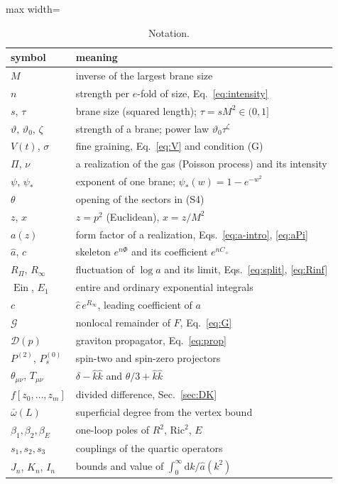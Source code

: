 \documentclass[a4paper,11pt]{article}
\newcommand{\dd}{\mathrm{d}}
\newcommand{\Ein}{\operatorname{Ein}}
\newcommand{\Pt}{P^{(2)}}
\newcommand{\Ps}{P^{(0)}_{s}}
\newcommand{\Ric}{\mathrm{Ric}}
\begin{document}
\begin{table}[tb]
\centering
\small\begin{adjustbox}{max width=\linewidth}\begin{tabular}{lp{5.6cm}}
symbol & meaning\\
\hline
$M$ & inverse of the largest brane size\\
$n$ & strength per $e$-fold of size, Eq.~\eqref{eq:intensity}\\
$s$, $\tau$ & brane size (squared length); $\tau=sM^2\in(0,1]$\\
$\vartheta$, $\vartheta_0$, $\zeta$ & strength of a brane; power law $\vartheta_0\tau^\zeta$\\
$V(t)$, $\sigma$ & fine graining, Eq.~\eqref{eq:V} and condition (G)\\
$\Pi$, $\nu$ & a realization of the gas (Poisson process) and its intensity\\
$\psi$, $\psi_*$ & exponent of one brane; $\psi_*(w)=1-e^{-w^2}$\\
$\theta$ & opening of the sectors in (S4)\\
$z$, $x$ & $z=p^2$ (Euclidean), $x=z/M^2$\\
$a(z)$ & form factor of a realization, Eqs.~\eqref{eq:a-intro}, \eqref{eq:aPi}\\
$\hat a$, $\hat c$ & skeleton $e^{n\Phi}$ and its coefficient $e^{nC_+}$\\
$R_\Pi$, $R_\infty$ & fluctuation of $\log a$ and its limit, Eqs.~\eqref{eq:split}, \eqref{eq:Rinf}\\
$\Ein$, $E_1$ & entire and ordinary exponential integrals\\
$c$ & $\hat c\,e^{R_\infty}$, leading coefficient of $a$\\
$\mathcal G$ & nonlocal remainder of $F$, Eq.~\eqref{eq:G}\\
$\mathcal D(p)$ & graviton propagator, Eq.~\eqref{eq:prop}\\
$\Pt$, $\Ps$ & spin-two and spin-zero projectors\\
$\theta_{\mu\nu}$, $T_{\mu\nu}$ & $\delta-\hat k\hat k$ and $\theta/3+\hat k\hat k$\\
$f[z_0,\dots,z_m]$ & divided difference, Sec.~\ref{sec:DK}\\
$\bar\omega(L)$ & superficial degree from the vertex bound\\
$\beta_1,\beta_2,\beta_E$ & one-loop poles of $R^2$, $\Ric^2$, $E$\\
$s_1,s_2,s_3$ & couplings of the quartic operators\\
$J_n$, $K_n$, $I_n$ & bounds and value of $\int_0^\infty\dd k/\hat a(k^2)$\\
\hline\hline
\end{tabular}\end{adjustbox}
\caption{Notation.}
\label{tab:notation}
\end{table}
\end{document}
